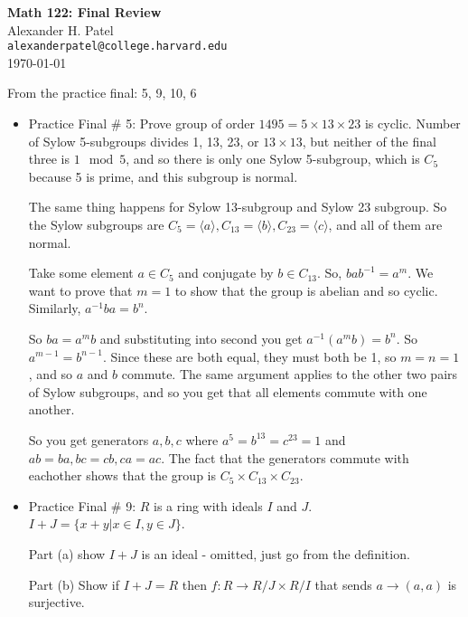 \documentclass[12pt]{article}
\begin{document}
\begin{center}
\textbf{Math 122: Final Review} \\
Alexander H. Patel \\
{\tt alexanderpatel@college.harvard.edu} \\
\today
\end{center}

From the practice final: 5, 9, 10, 6

\begin{itemize}
	\item
        Practice Final \# 5: Prove group of order $1495 = 5 \times 13 \times
        23$ is cyclic. Number of Sylow 5-subgroups divides 1, 13, 23, or $13
        \times 13$, but neither of the final three is $1 \mod 5$, and so there
        is only one Sylow 5-subgroup, which is $C_5$ because 5 is prime, and
        this subgroup is normal.

        The same thing happens for Sylow 13-subgroup and Sylow 23 subgroup. So
        the Sylow subgroups are $C_5 = \langle a \rangle, C_13 = \langle b
        \rangle, C_23 = \langle c \rangle$, and all of them are normal. 

        Take some element $a \in C_5$ and conjugate by $b \in C_13$. So,
        $bab^{-1} = a^m$. We want to prove that $m = 1$ to show that the group
        is abelian and so cyclic. Similarly, $a^{-1}ba = b^n$.

        So $ba = a^mb$ and substituting into second you get $a^{-1}(a^mb) =
        b^n$. So $a^{m-1} = b^{n-1}$. Since these are both equal, they must
        both be 1, so $m = n = 1$, and so $a$ and $b$ commute. The same
        argument applies to the other two pairs of Sylow subgroups, and so you
        get that all elements commute with one another.

        So you get generators $a, b, c$ where $a^5 = b^13 = c^23 = 1$ and $ab =
        ba, bc = cb, ca = ac$. The fact that the generators commute with
        eachother shows that the group is $C_5 \times C_13 \times C_23$.

    \item
        Practice Final \# 9: $R$ is a ring with ideals $I$ and $J$. $I + J =
        \{x + y| x \in I, y \in J\}$.

        Part (a) show $I + J$ is an ideal - omitted, just go from the definition.

        Part (b) Show if $I + J = R$ then $f: R \rightarrow R/J \times R/I$
        that sends $a \rightarrow (a, a)$ is surjective. 


\end{itemize}
\end{document}
